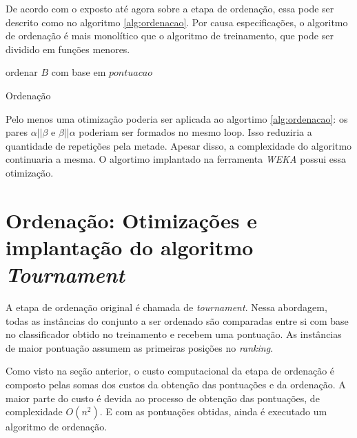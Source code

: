 De acordo com o exposto até agora sobre a etapa de ordenação, essa pode ser descrito como no algoritmo \ref{alg:ordenacao}. Por causa especificações, o algoritmo de ordenação é mais monolítico que o algoritmo de treinamento, que pode ser dividido em funções menores.

\begin{algorithm}


    ordenar $B$ com base em $pontuacao$

    \caption{Ordenação}
    \label{alg:ordenacao}
\end{algorithm}

Pelo menos uma otimização poderia ser aplicada ao algortimo \ref{alg:ordenacao}: os pares $\alpha || \beta$ e $\beta || \alpha$ poderiam ser formados no mesmo loop. Isso reduziria a quantidade de repetições pela metade. Apesar disso, a complexidade do algoritmo continuaria a mesma. O algortimo implantado na ferramenta \emph{WEKA} possui essa otimização.


\section{Ordenação: Otimizações e implantação do algoritmo \emph{Tournament}}

A etapa de ordenação original é chamada de \emph{tournament}. Nessa abordagem, todas as instâncias do conjunto a ser ordenado são comparadas entre si com base no classificador obtido no treinamento e recebem uma pontuação. As instâncias de maior pontuação assumem as primeiras posições no \emph{ranking}.

Como visto na seção anterior, o custo computacional da etapa de ordenação é composto pelas somas dos custos da obtenção das pontuações e da ordenação. A maior parte do custo é devida ao processo de obtenção das pontuações, de complexidade $O(n^2)$. E com as pontuações obtidas, ainda é executado um algoritmo de ordenação.

